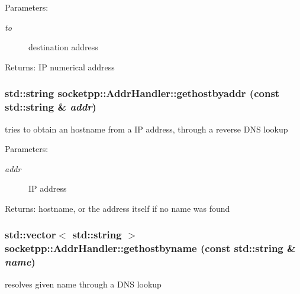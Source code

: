 \begin{Desc}
\item[Parameters:]
\begin{description}
\item[{\em to}]destination address \end{description}
\end{Desc}
\begin{Desc}
\item[Returns:]IP numerical address \end{Desc}
\hypertarget{classsocketpp_1_1AddrHandler_2e9b9e6dc7ea4fc4a3500665b3f4062d}{
\subsubsection[{gethostbyaddr}]{\setlength{\rightskip}{0pt plus 5cm}std::string socketpp::AddrHandler::gethostbyaddr (const std::string \& {\em addr})}}
\label{classsocketpp_1_1AddrHandler_2e9b9e6dc7ea4fc4a3500665b3f4062d}


tries to obtain an hostname from a IP address, through a reverse DNS lookup 

\begin{Desc}
\item[Parameters:]
\begin{description}
\item[{\em addr}]IP address \end{description}
\end{Desc}
\begin{Desc}
\item[Returns:]hostname, or the address itself if no name was found \end{Desc}
\hypertarget{classsocketpp_1_1AddrHandler_d840f7fee97d701511f09459bef35748}{
\subsubsection[{gethostbyname}]{\setlength{\rightskip}{0pt plus 5cm}std::vector$<$ std::string $>$ socketpp::AddrHandler::gethostbyname (const std::string \& {\em name})}}
\label{classsocketpp_1_1AddrHandler_d840f7fee97d701511f09459bef35748}


resolves given name through a DNS lookup 

